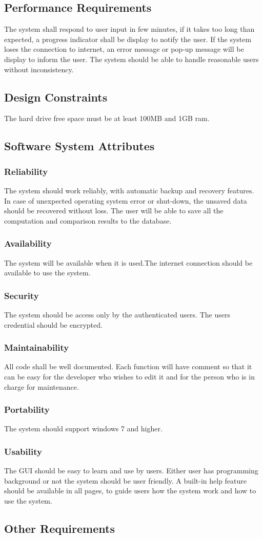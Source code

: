 \documentclass[a4paper,12pt]{article}
\begin{document}
\subsection{Performance Requirements}
The system shall respond to user input in few minutes, if it takes too long than expected, a progress indicator shall be display to notify the user.
If the system loses the connection to internet, an error message or pop-up message will be display to inform the user.
The system should be able to handle reasonable users without inconsistency.
\subsection{Design Constraints}
The hard drive free space must be at least 100MB and 1GB ram.
\subsection{Software System Attributes}
\subsubsection{Reliability}
The system should work reliably, with automatic backup and recovery features. In case of unexpected operating system error or shut-down, the unsaved data should be recovered without loss. The user will be able to save all the computation and comparison results to the database.
\subsubsection{Availability}
The system will be available when it is used.The internet connection should be available to use the system.
\subsubsection{ Security }
The system should be access only by the authenticated users. The users credential should be encrypted.\subsubsection{Maintainability}
All code shall be well documented. Each function will have comment so that it can be easy for the developer who wishes to edit it and for the person who is in charge for maintenance.
\subsubsection{Portability}
The system should support windows 7 and higher.
\subsubsection{Usability}
 The GUI should be easy to learn and use by users. Either user has programming background or not the system should be user friendly. A built-in help feature should be available in all pages, to guide users how the system work and how to use the system.
\subsection{Other Requirements}

\newpage
\clearpage
{}
\end{document}
